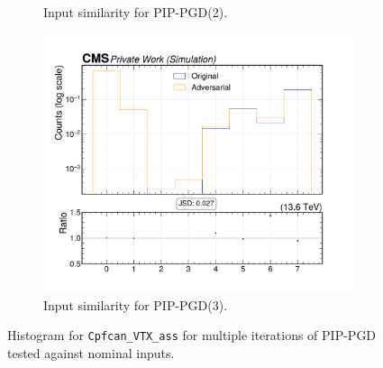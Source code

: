 \begin{figure}[htbp]
\begin{subfigure}[t]{0.32\textwidth}
    \caption*{Input similarity for PIP-PGD(2).}
  \end{subfigure}\hfill
  \begin{subfigure}[t]{0.32\textwidth}
    \includegraphics[width=\linewidth]{media/output/features/compare/combined_it_3/cmp_cpf_arr_Cpfcan_VTX_ass.pdf}
    \caption*{Input similarity for PIP-PGD(3).}
  \end{subfigure}

  \caption*{Histogram for \texttt{Cpfcan\_VTX\_ass} for multiple iterations of PIP-PGD tested against nominal inputs.}
  \label{fig:combined_input_Cpfcan_VTX_ass}
\end{figure}


